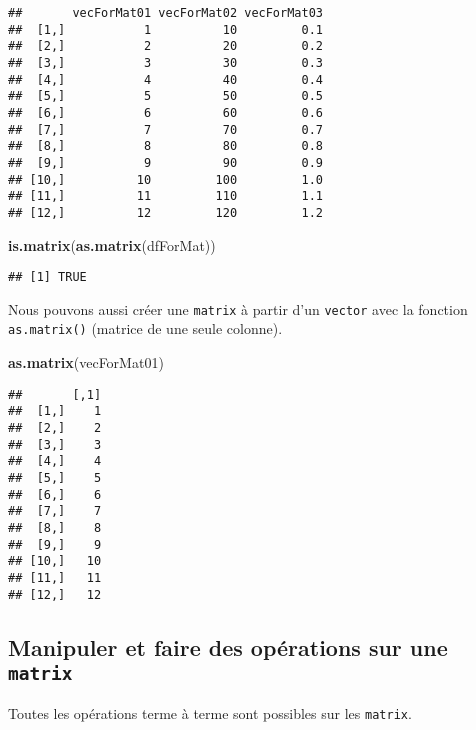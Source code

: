 \documentclass[]{book}
\newenvironment{Shaded}{\begin{snugshade}}{\end{snugshade}}
\newcommand{\KeywordTok}[1]{\textcolor[rgb]{0.13,0.29,0.53}{\textbf{#1}}}
\newcommand{\NormalTok}[1]{#1}
\theoremstyle{definition}
\theoremstyle{definition}
\theoremstyle{definition}
\theoremstyle{remark}
\begin{document}
\begin{verbatim}
##       vecForMat01 vecForMat02 vecForMat03
##  [1,]           1          10         0.1
##  [2,]           2          20         0.2
##  [3,]           3          30         0.3
##  [4,]           4          40         0.4
##  [5,]           5          50         0.5
##  [6,]           6          60         0.6
##  [7,]           7          70         0.7
##  [8,]           8          80         0.8
##  [9,]           9          90         0.9
## [10,]          10         100         1.0
## [11,]          11         110         1.1
## [12,]          12         120         1.2
\end{verbatim}

\begin{Shaded}
\begin{Highlighting}[]
\KeywordTok{is.matrix}\NormalTok{(}\KeywordTok{as.matrix}\NormalTok{(dfForMat))}
\end{Highlighting}
\end{Shaded}

\begin{verbatim}
## [1] TRUE
\end{verbatim}

Nous pouvons aussi créer une \texttt{matrix} à partir d'un
\texttt{vector} avec la fonction \texttt{as.matrix()} (matrice de une
seule colonne).

\begin{Shaded}
\begin{Highlighting}[]
\KeywordTok{as.matrix}\NormalTok{(vecForMat01)}
\end{Highlighting}
\end{Shaded}

\begin{verbatim}
##       [,1]
##  [1,]    1
##  [2,]    2
##  [3,]    3
##  [4,]    4
##  [5,]    5
##  [6,]    6
##  [7,]    7
##  [8,]    8
##  [9,]    9
## [10,]   10
## [11,]   11
## [12,]   12
\end{verbatim}

\subsection{\texorpdfstring{Manipuler et faire des opérations sur une
\texttt{matrix}}{Manipuler et faire des opérations sur une matrix}}\label{manipuler-et-faire-des-operations-sur-une-matrix}

Toutes les opérations terme à terme sont possibles sur les
\texttt{matrix}.
\end{document}
